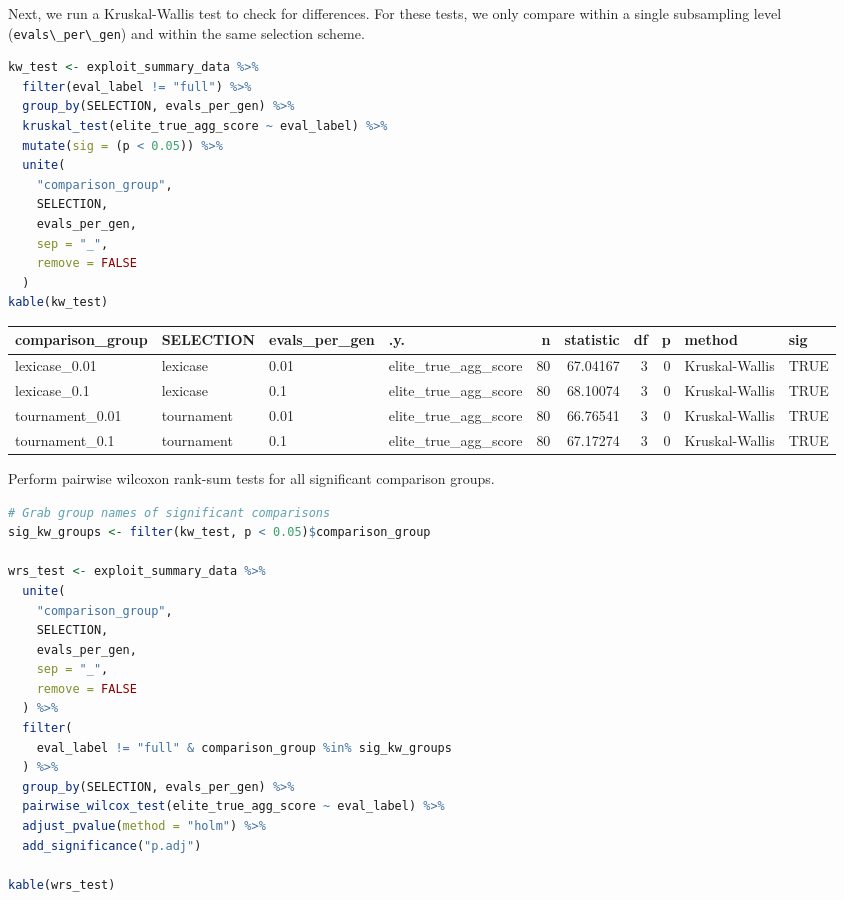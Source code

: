\documentclass[
]{book}
\newcommand{\passthrough}[1]{#1}
\begin{document}
Next, we run a Kruskal-Wallis test to check for differences.
For these tests, we only compare within a single subsampling level (\passthrough{\lstinline!evals\_per\_gen!}) and within the same selection scheme.

\begin{lstlisting}[language=R]
kw_test <- exploit_summary_data %>%
  filter(eval_label != "full") %>%
  group_by(SELECTION, evals_per_gen) %>%
  kruskal_test(elite_true_agg_score ~ eval_label) %>%
  mutate(sig = (p < 0.05)) %>%
  unite(
    "comparison_group",
    SELECTION,
    evals_per_gen,
    sep = "_",
    remove = FALSE
  )
kable(kw_test)
\end{lstlisting}

\begin{tabular}{l|l|l|l|r|r|r|r|l|l}
\hline
comparison\_group & SELECTION & evals\_per\_gen & .y. & n & statistic & df & p & method & sig\\
\hline
lexicase\_0.01 & lexicase & 0.01 & elite\_true\_agg\_score & 80 & 67.04167 & 3 & 0 & Kruskal-Wallis & TRUE\\
\hline
lexicase\_0.1 & lexicase & 0.1 & elite\_true\_agg\_score & 80 & 68.10074 & 3 & 0 & Kruskal-Wallis & TRUE\\
\hline
tournament\_0.01 & tournament & 0.01 & elite\_true\_agg\_score & 80 & 66.76541 & 3 & 0 & Kruskal-Wallis & TRUE\\
\hline
tournament\_0.1 & tournament & 0.1 & elite\_true\_agg\_score & 80 & 67.17274 & 3 & 0 & Kruskal-Wallis & TRUE\\
\hline
\end{tabular}

Perform pairwise wilcoxon rank-sum tests for all significant comparison groups.

\begin{lstlisting}[language=R]
# Grab group names of significant comparisons
sig_kw_groups <- filter(kw_test, p < 0.05)$comparison_group

wrs_test <- exploit_summary_data %>%
  unite(
    "comparison_group",
    SELECTION,
    evals_per_gen,
    sep = "_",
    remove = FALSE
  ) %>%
  filter(
    eval_label != "full" & comparison_group %in% sig_kw_groups
  ) %>%
  group_by(SELECTION, evals_per_gen) %>%
  pairwise_wilcox_test(elite_true_agg_score ~ eval_label) %>%
  adjust_pvalue(method = "holm") %>%
  add_significance("p.adj")

kable(wrs_test)
\end{lstlisting}
\end{document}
